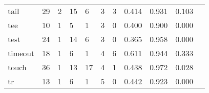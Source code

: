 \begin{longtable}{lp{1.20cm}p{1.20cm}p{1.20cm}p{1.20cm}p{1.20cm}p{1.20cm}p{1.20cm}p{1.20cm}p{1.20cm}p{1.20cm}}
tail      &                                    29 &                                                  2 &                                                 15 &                                                  6 &                                                  3 &                                                  3 &                                         0.414 &                                              0.931 &                                              0.103 \\
tee       &                                    10 &                                                  1 &                                                  5 &                                                  1 &                                                  3 &                                                  0 &                                         0.400 &                                              0.900 &                                              0.000 \\
test      &                                    24 &                                                  1 &                                                 14 &                                                  6 &                                                  3 &                                                  0 &                                         0.365 &                                              0.958 &                                              0.000 \\
timeout   &                                    18 &                                                  1 &                                                  6 &                                                  1 &                                                  4 &                                                  6 &                                         0.611 &                                              0.944 &                                              0.333 \\
touch     &                                    36 &                                                  1 &                                                 13 &                                                 17 &                                                  4 &                                                  1 &                                         0.438 &                                              0.972 &                                              0.028 \\
tr        &                                    13 &                                                  1 &                                                  6 &                                                  1 &                                                  5 &                                                  0 &                                         0.442 &                                              0.923 &                                              0.000 \\

\end{longtable}
